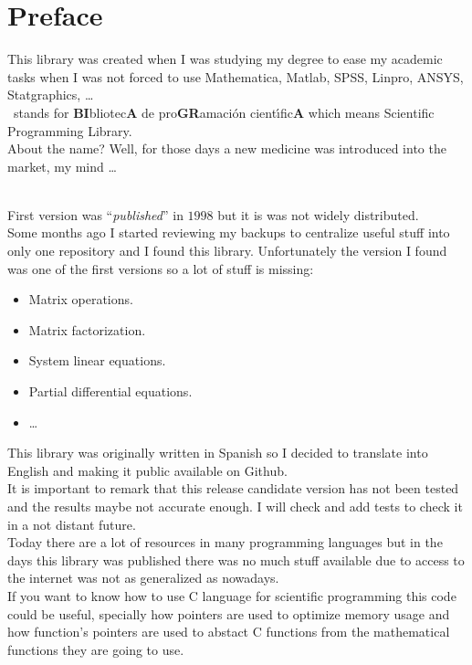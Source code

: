 %
%

\chapter*{Preface} 

This library was created when I was studying my degree to ease my academic tasks when I was not forced to use Mathematica, Matlab, SPSS, Linpro, ANSYS, Statgraphics, \dots\\

\BI \ stands for \textbf{BI}bliotec\textbf{A} de pro\textbf{GR}amaci\'on cient\'{\i}fic\textbf{A} which means Scientific Programming Library.\\

About the name? Well, for those days a new medicine was introduced into the market, my mind \dots \\\

First version was ``\emph{published}'' in $1998$ but it is was not widely distributed.\\

Some months ago I started reviewing my backups to centralize useful stuff into only one repository and I found this library. Unfortunately the version I found was one of the first versions so a lot of stuff is missing:
%
\begin{itemize}
\item Matrix operations.
\item Matrix factorization.
\item System linear equations.
\item Partial differential equations.
\item \dots
\end{itemize}
%
This library was originally written in Spanish so I decided to translate into English and making it public available on Github.\\

It is important to remark that this release candidate version has not been tested and the results maybe not accurate enough. I will check and add tests to check it in a not distant future.\\

Today there are a lot of resources in many programming languages but in the days this library was published there was no much stuff available due to access to the internet was not as generalized as nowadays.\\

If you want to know how to use C language for scientific programming this code could be useful, specially how pointers are used to optimize memory usage and how function's pointers are used to abstact C functions from the mathematical functions they are going to use.\\

